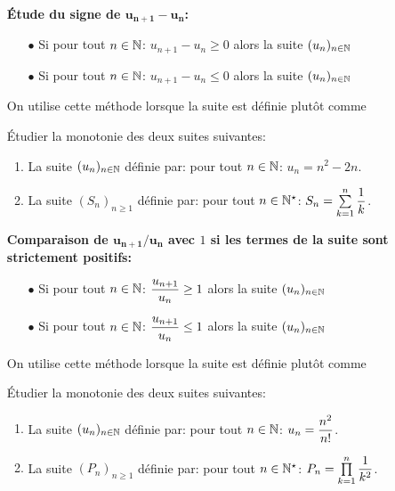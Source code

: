 \documentclass[a4paper, 11pt]{article}
\begin{document}
\begin{enumerate}
\item[\ding{182}] {\textbf{\'Etude du signe de $\mathbf{u_{n+1}-u_n}$:}}\\
\begin{itemize}
\item[$\bullet$] Si pour tout $n\in\mathbb{N}$: $u_{n+1}-u_n\geq 0$ alors la suite $(u_n)_{n\in \mathbb{N}}$ \dotfill\vspace{0.3cm}
\item[$\bullet$] Si pour tout $n\in\mathbb{N}$: $u_{n+1}-u_n\leq 0$ alors la suite $(u_n)_{n\in \mathbb{N}}$ \dotfill \vspace{0.3cm}
\end{itemize}

On utilise cette m\'ethode lorsque la suite est d\'efinie plut\^ot comme \dotfill

{\footnotesize 
\begin{exercice}
\'Etudier la monotonie des deux suites suivantes:
\begin{enumerate}
\item La suite $(u_n)_{n\in \mathbb{N}}$ d\'efinie par: pour tout $n\in\mathbb{N}$: $u_n=n^2-2n$.
\item La suite $(S_n)_{n\geq 1}$ d\'efinie par: pour tout $n\in\mathbb{N}^\star$: $S_n=\sum\limits_{k=1}^n \displaystyle\frac{1}{k}$.
\end{enumerate}
\end{exercice}}


\item[\ding{183}] {\textbf{ Comparaison de $\mathbf{u_{n+1}/u_n}$ avec $1$ si les termes de la suite sont strictement positifs:}}\\
\begin{itemize}
\item[$\bullet$] Si pour tout $n\in\mathbb{N}$: $\displaystyle\frac{u_{n+1}}{u_n}\geq 1$ alors la suite $(u_n)_{n\in \mathbb{N}}$ \dotfill\vspace{0.3cm}
\item[$\bullet$] Si pour tout $n\in\mathbb{N}$: $\displaystyle\frac{u_{n+1}}{u_n}\leq 1$ alors la suite $(u_n)_{n\in \mathbb{N}}$ \dotfill \vspace{0.3cm}
\end{itemize}

On utilise cette m\'ethode lorsque la suite est d\'efinie plut\^ot comme \dotfill

{\footnotesize 
\begin{exercice}
\'Etudier la monotonie des deux suites suivantes:
\begin{enumerate}
\item La suite $(u_n)_{n\in \mathbb{N}}$ d\'efinie par: pour tout $n\in\mathbb{N}$: $u_n=\displaystyle\frac{n^2}{n!}$.
\item La suite $(P_n)_{n\geq 1}$ d\'efinie par: pour tout $n\in\mathbb{N}^\star$: $P_n=\prod\limits_{k=1}^n \displaystyle\frac{1}{k^2}$.
\end{enumerate}
\end{exercice}}

\end{enumerate}
\end{document}

